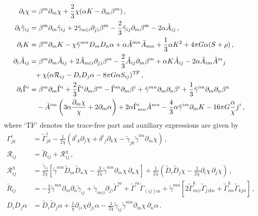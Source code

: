 \documentclass[]{iopart}
\begin{document}
\begin{align}
  \partial_t \chi &= \beta^m\partial_m \chi
  + \frac{2}{3}\chi( \alpha K-\partial_m \beta^m)\,,
  \label{eq:chit} \\
  \partial_t \tilde{\gamma}_{ij} &=
  \beta^m\partial_m \tilde{\gamma}_{ij}
  + 2 \tilde{\gamma}_{m(i}\partial_{j)}\beta^m
  - \frac{2}{3}\tilde{\gamma}_{ij}\partial_m \beta^m
  -2\alpha \tilde{A}_{ij}\,, \\
  \partial_t K &=
  \beta^m\partial_m K
  -\chi \tilde{\gamma}^{mn}D_m D_n\alpha
  +\alpha \tilde{A}^{mn}\tilde{A}_{mn}
  +\frac{1}{3}\alpha K^2
  +4\pi G \alpha (S+\rho)\,, \\
  \partial_t \tilde{A}_{ij} &=
  \beta^m\partial_m \tilde{A}_{ij}
  +2\tilde{A}_{m(i}\partial_{j)}\beta^m
  -\frac{2}{3}\tilde{A}_{ij}\partial_m \beta^m
  +\alpha K \tilde{A}_{ij}
  -2\alpha\tilde{A}_{im}\tilde{A}^{m}{}_j
  \nonumber \\
  &~~
  +\chi (\alpha \mathcal{R}_{ij}-D_i D_j \alpha -8\pi G
        \alpha S_{ij})^{\rm TF}\,, \\
  \partial_t \tilde{\Gamma}^i &=
  \beta^m \partial_m \tilde{\Gamma}^i
  +\frac{2}{3}\tilde{\Gamma}^i\partial_m \beta^m
  -\tilde{\Gamma}^m\partial_m \beta^i
  +\tilde{\gamma}^{mn}\partial_m\partial_n \beta^i
  +\frac{1}{3}\tilde{\gamma}^{im}\partial_m\partial_n\beta^n
  \nonumber \\
  &~~~
  -\tilde{A}^{im}\left( 3\alpha \frac{\partial_m \chi}{\chi}
        +2\partial_m \alpha\right)
  +2\alpha\tilde{\Gamma}^i_{mn}\tilde{A}^{mn}
  -\frac{4}{3}\alpha\tilde{\gamma}^{im}\partial_m K
  -16\pi G \frac{\alpha}{\chi}j^i\,,
  \label{eq:Gammait}
\end{align}
%
where `TF' denotes the trace-free part and auxiliary expressions
are given by
%
\begin{align}
  \Gamma^i_{jk} &=
  \tilde{\Gamma}^i_{jk}
  -\frac{1}{2\chi}( \delta^i{}_k\partial_j \chi
        +\delta^i{}_j\partial_k \chi
        -\tilde{\gamma}_{jk}\tilde{\gamma}^{im}\partial_m \chi)
        \,, \nonumber\\
  \mathcal{R}_{ij} &= \tilde{R}_{ij}+ \mathcal{R}^{\chi}_{ij}
  \,, \nonumber\\
  \mathcal{R}^{\chi}_{ij} &=
  \frac{\tilde{\gamma}_{ij}}{2\chi}
  \left[
  \tilde{\gamma}^{mn}\tilde{D}_m\tilde{D}_n \chi
  -\frac{3}{2\chi}\tilde{\gamma}^{mn}\partial_m \chi\,\partial_n \chi
  \right]
  +\frac{1}{2\chi}
  \left(
  \tilde{D}_i \tilde{D}_j \chi
  -\frac{1}{2\chi}\partial_i \chi \,\partial_j \chi
  \right)
  \,, \nonumber\\
  \tilde{R}_{ij} &=
  -\frac{1}{2}\tilde{\gamma}^{mn}\partial_m \partial_n\tilde{\gamma}_{ij}
  +\tilde{\gamma}_{m(i}\partial_{j)}\tilde{\Gamma}^m
  +\tilde{\Gamma}^m\tilde{\Gamma}_{(ij)m}
  +\tilde{\gamma}^{mn}
  \left[
  2\tilde{\Gamma}^k_{m(i}\tilde{\Gamma}_{j)kn}
  +\tilde{\Gamma}^k_{im}\tilde{\Gamma}_{kjn}
  \right]\,,\nonumber\\
  D_i D_j \alpha &=
  \tilde{D}_i \tilde{D}_j \alpha
  + \frac{1}{\chi}\partial_{(i}\chi \partial_{j)}\alpha
  -\frac{1}{2\chi}\tilde{\gamma}_{ij}\tilde{\gamma}^{mn}
        \partial_m \chi \,\partial_n \alpha\,.
\end{align}
\end{document}
